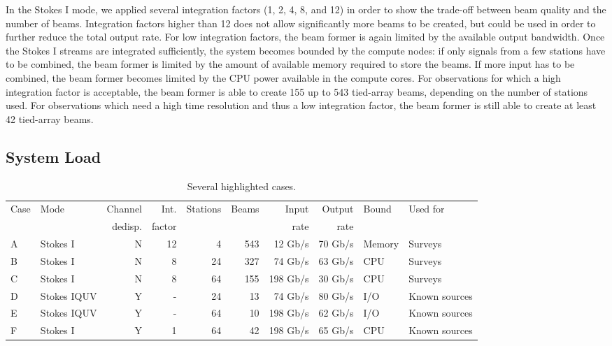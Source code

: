 \documentclass{llncs}
\begin{document}
In the Stokes I mode, we applied several integration factors (1, 2, 4, 8, and 12) in order to show the trade-off between beam quality and the number of beams. Integration factors higher than 12 does not allow significantly more beams to be created, but could be used in order to further reduce the total output rate. For low integration factors, the beam former is again limited by the available output bandwidth. Once the Stokes I streams are integrated sufficiently, the system becomes bounded by the compute nodes: if only signals from a few stations have to be combined, the beam former is limited by the amount of available memory required to store the beams. If more input has to be combined, the beam former becomes limited by the CPU power available in the compute cores. For observations for which a high integration factor is acceptable, the beam former is able to create 155 up to 543 tied-array beams, depending on the number of stations used. For observations which need a high time resolution and thus a low integration factor, the beam former is still able to create at least 42 tied-array beams.

\subsection{System Load}

\begin{table}
\begin{tabular}{l|l|r|r|r|r|r|r|l|l}
Case & Mode & Channel & Int. & Stations & Beams  & Input & Output & Bound & Used for \\
     &      & dedisp. & factor      &          &        & rate  & rate   &       & \\
\hline
\hline
A & Stokes I    & N & 12 &  4 & 543 &  12 Gb/s & 70 Gb/s & Memory & Surveys \\
B & Stokes I    & N &  8 & 24 & 327 &  74 Gb/s & 63 Gb/s & CPU   & Surveys \\
C & Stokes I    & N &  8 & 64 & 155 & 198 Gb/s & 30 Gb/s & CPU   & Surveys \\  
D & Stokes IQUV & Y & - & 24 &  13 &  74 Gb/s & 80 Gb/s & I/O   & Known sources \\
E & Stokes IQUV & Y & - & 64 &  10 & 198 Gb/s & 62 Gb/s & I/O   & Known sources \\
F & Stokes I    & Y & 1 & 64 &  42 & 198 Gb/s & 65 Gb/s & CPU   & Known sources 
\end{tabular}
\caption{Several highlighted cases.}
\label{table:cases}
\end{table}
\end{document}
